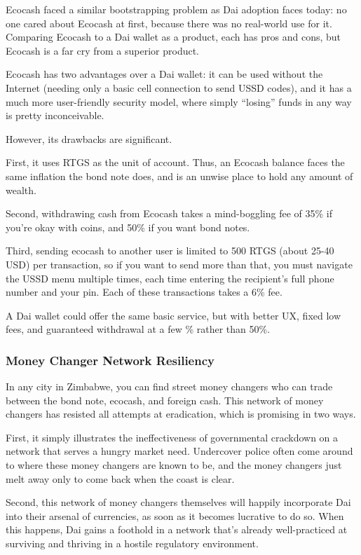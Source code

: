\documentclass{article}
\begin{document}
Ecocash faced a similar bootstrapping problem as Dai adoption faces today: no one cared about Ecocash at first, because there was no real-world use for it. Comparing Ecocash to a Dai wallet as a product, each has pros and cons, but Ecocash is a far cry from a superior product.

Ecocash has two advantages over a Dai wallet: it can be used without the Internet (needing only a basic cell connection to send USSD codes), and it has a much more user-friendly security model, where simply ``losing'' funds in any way is pretty inconceivable.

However, its drawbacks are significant.

First, it uses RTGS as the unit of account. Thus, an Ecocash balance faces the same inflation the bond note does, and is an unwise place to hold any amount of wealth.

Second, withdrawing cash from Ecocash takes a mind-boggling fee of 35\% if you're okay with coins, and 50\% if you want bond notes.

Third, sending ecocash to another user is limited to 500 RTGS (about 25-40 USD) per transaction, so if you want to send more than that, you must navigate the USSD menu multiple times, each time entering the recipient's full phone number and your pin. Each of these transactions takes a 6\% fee.

A Dai wallet could offer the same basic service, but with better UX, fixed low fees, and guaranteed withdrawal at a few \% rather than 50\%.

\subsubsection{Money Changer Network Resiliency} \label{resilient money changers}

In any city in Zimbabwe, you can find street money changers who can trade between the bond note, ecocash, and foreign cash. This network of money changers has resisted all attempts at eradication, which is promising in two ways.

First, it simply illustrates the ineffectiveness of governmental crackdown on a network that serves a hungry market need. Undercover police often come around to where these money changers are known to be, and the money changers just melt away only to come back when the coast is clear. 

Second, this network of money changers themselves will happily incorporate Dai into their arsenal of currencies, as soon as it becomes lucrative to do so. When this happens, Dai gains a foothold in a network that's already well-practiced at surviving and thriving in a hostile regulatory
environment.
\end{document}
